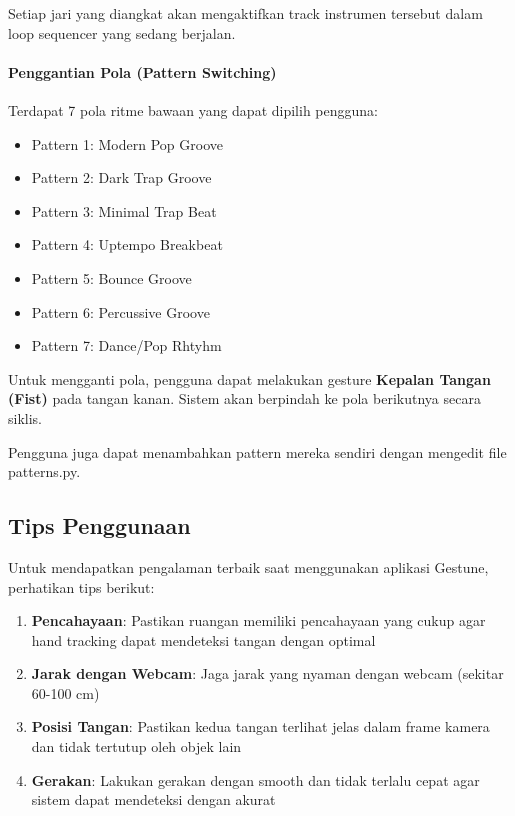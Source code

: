 Setiap jari yang diangkat akan mengaktifkan track instrumen tersebut dalam loop sequencer yang sedang berjalan.

\paragraph{Penggantian Pola (Pattern Switching)}
Terdapat 7 pola ritme bawaan yang dapat dipilih pengguna:
\begin{itemize}
    \item Pattern 1: Modern Pop Groove
    \item Pattern 2: Dark Trap Groove
    \item Pattern 3: Minimal Trap Beat
    \item Pattern 4: Uptempo Breakbeat
    \item Pattern 5: Bounce Groove
    \item Pattern 6: Percussive Groove
    \item Pattern 7: Dance/Pop Rhtyhm
\end{itemize}

Untuk mengganti pola, pengguna dapat melakukan gesture \textbf{Kepalan Tangan (Fist)} pada tangan kanan. Sistem akan berpindah ke pola berikutnya secara siklis.

Pengguna juga dapat menambahkan pattern mereka sendiri dengan mengedit file patterns.py. 

\subsection{Tips Penggunaan}

Untuk mendapatkan pengalaman terbaik saat menggunakan aplikasi Gestune, perhatikan tips berikut:

\begin{enumerate}
    \item \textbf{Pencahayaan}: Pastikan ruangan memiliki pencahayaan yang cukup agar hand tracking dapat mendeteksi tangan dengan optimal
    
    \item \textbf{Jarak dengan Webcam}: Jaga jarak yang nyaman dengan webcam (sekitar 60-100 cm)
    
    \item \textbf{Posisi Tangan}: Pastikan kedua tangan terlihat jelas dalam frame kamera dan tidak tertutup oleh objek lain
    
    \item \textbf{Gerakan}: Lakukan gerakan dengan smooth dan tidak terlalu cepat agar sistem dapat mendeteksi dengan akurat
    
\end{enumerate}

